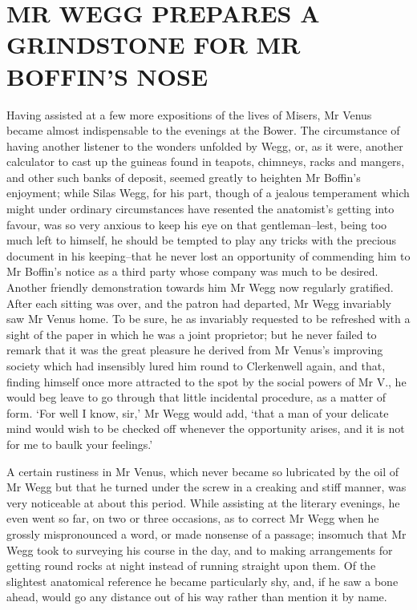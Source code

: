 
\chapter{MR WEGG PREPARES A GRINDSTONE FOR MR BOFFIN’S NOSE}

Having assisted at a few more expositions of the lives of Misers, Mr
Venus became almost indispensable to the evenings at the Bower. The
circumstance of having another listener to the wonders unfolded by
Wegg, or, as it were, another calculator to cast up the guineas found in
teapots, chimneys, racks and mangers, and other such banks of deposit,
seemed greatly to heighten Mr Boffin’s enjoyment; while Silas Wegg, for
his part, though of a jealous temperament which might under ordinary
circumstances have resented the anatomist’s getting into favour, was
so very anxious to keep his eye on that gentleman--lest, being too
much left to himself, he should be tempted to play any tricks with the
precious document in his keeping--that he never lost an opportunity of
commending him to Mr Boffin’s notice as a third party whose company was
much to be desired. Another friendly demonstration towards him Mr Wegg
now regularly gratified. After each sitting was over, and the patron
had departed, Mr Wegg invariably saw Mr Venus home. To be sure, he as
invariably requested to be refreshed with a sight of the paper in which
he was a joint proprietor; but he never failed to remark that it was the
great pleasure he derived from Mr Venus’s improving society which had
insensibly lured him round to Clerkenwell again, and that, finding
himself once more attracted to the spot by the social powers of Mr V.,
he would beg leave to go through that little incidental procedure, as a
matter of form. ‘For well I know, sir,’ Mr Wegg would add, ‘that a
man of your delicate mind would wish to be checked off whenever the
opportunity arises, and it is not for me to baulk your feelings.’

A certain rustiness in Mr Venus, which never became so lubricated by
the oil of Mr Wegg but that he turned under the screw in a creaking and
stiff manner, was very noticeable at about this period. While assisting
at the literary evenings, he even went so far, on two or three
occasions, as to correct Mr Wegg when he grossly mispronounced a word,
or made nonsense of a passage; insomuch that Mr Wegg took to surveying
his course in the day, and to making arrangements for getting round
rocks at night instead of running straight upon them. Of the slightest
anatomical reference he became particularly shy, and, if he saw a bone
ahead, would go any distance out of his way rather than mention it by
name.

